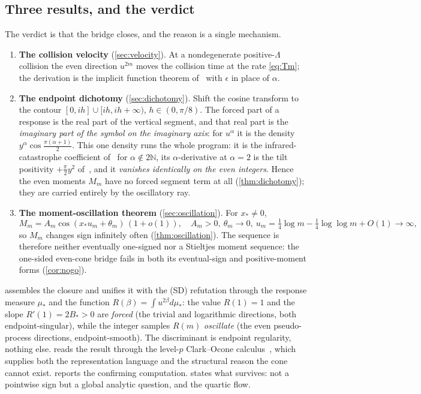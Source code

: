 \documentclass[11pt,reqno]{amsart}
\theoremstyle{plain}
\theoremstyle{definition}
\theoremstyle{remark}
\newcommand{\N}{\mathbb N}
\begin{document}
\subsection*{Three results, and the verdict}
The verdict is that the bridge closes, and the reason is a single mechanism.
\begin{enumerate}
\item \textbf{The collision velocity} (\cref{sec:velocity}). At a
nondegenerate positive-$\Lambda$ collision the even direction $u^{2m}$ moves
the collision time at the rate \eqref{eq:Tm}; the derivation is the
implicit function theorem of~\cite{Fsymbol} with $\epsilon$ in place of
$\alpha$.
\item \textbf{The endpoint dichotomy} (\cref{sec:dichotomy}). Shift the
cosine transform to the contour $[0,ih]\cup[ih,ih+\infty)$, $h\in(0,\pi/8)$.
The forced part of a response is the real part of the vertical segment, and
that real part is the \emph{imaginary part of the symbol on the imaginary
axis}: for $u^\alpha$ it is the density $y^\alpha\cos\tfrac{\pi(\alpha+1)}2$.
This one density runs the whole program: it is the
infrared-catastrophe coefficient of~\cite{Fsymbol} for $\alpha\notin2\N$,
its $\alpha$-derivative at $\alpha=2$ is the tilt positivity
$+\tfrac\pi2y^2$ of~\cite{Fsymbol}, and it \emph{vanishes identically on the
even integers}. Hence the even moments $M_m$ have no forced segment term at
all (\cref{thm:dichotomy}); they are carried entirely by the oscillatory
ray.
\item \textbf{The moment-oscillation theorem} (\cref{sec:oscillation}). For
$x_*\neq0$,
\[
   M_m=A_m\cos(x_*u_m+\theta_m)\,(1+o(1)),\quad A_m>0,\ \theta_m\to0,\
   u_m=\tfrac14\log m-\tfrac14\log\log m+O(1)\to\infty,
\]
so $M_m$ changes sign infinitely often (\cref{thm:oscillation}). The
sequence is therefore neither eventually one-signed nor a Stieltjes moment
sequence: the one-sided even-cone bridge fails in both its eventual-sign and
positive-moment forms (\cref{cor:nogo}).
\end{enumerate}
 assembles the closure and unifies it with the (SD)
refutation through the response measure $\mu_*$ and the function
$R(\beta)=\int u^{2\beta}d\mu_*$: the value $R(1)=1$ and the slope
$R'(1)=2B_*>0$ are \emph{forced} (the trivial and logarithmic directions,
both endpoint-singular), while the integer samples $R(m)$ \emph{oscillate}
(the even pseudo-process directions, endpoint-smooth). The discriminant is
endpoint regularity, nothing else. \Cref{sec:probabilistic} reads the
result through the level-$p$ Clark--Ocone calculus~\cite{Fpseudo}, which
supplies both the representation language and the structural reason the cone
cannot exist. \Cref{sec:numerics} reports the confirming computation.
\Cref{sec:frontier} states what survives: not a pointwise sign but a global
analytic question, and the quartic flow.
\end{document}
